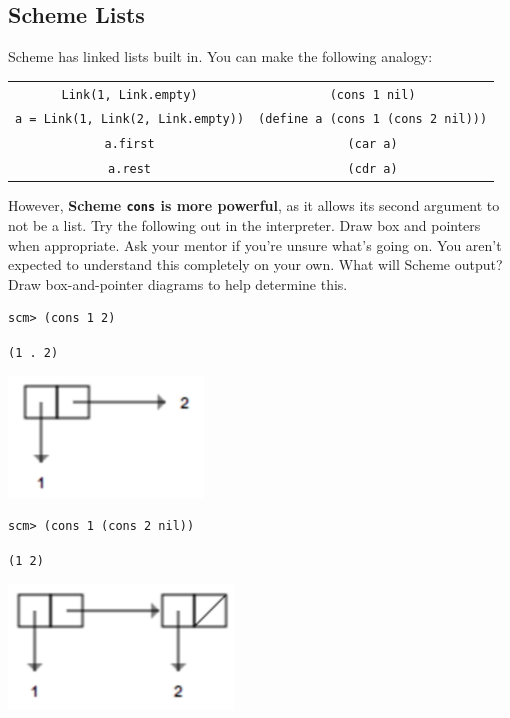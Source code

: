 \documentclass{exam}
\begin{document}
\begin{questions}
\section{Scheme Lists}
\begin{blocksection}
Scheme has linked lists built in. You can make the following analogy:
\begin{center}
\begin{tabular}{ |c|c| } 
\hline
 \texttt{Link(1, Link.empty)} & \texttt{(cons 1 nil)} \\ 
 \texttt{a = Link(1, Link(2, Link.empty))} & \texttt{(define a (cons 1 (cons 2 nil)))}  \\ 
 \texttt{a.first} & \texttt{(car a)} \\ 
 \texttt{a.rest} & \texttt{(cdr a)} \\
 \hline
\end{tabular}
\end{center}
However, \textbf{Scheme \texttt{cons} is more powerful}, as it allows its second argument to not be a list. Try the following out in the interpreter. Draw box and pointers when appropriate. Ask your mentor if you're unsure what's going on. You aren't expected to understand this completely on your own.
\question What will Scheme output? Draw box-and-pointer diagrams to help determine this.

\begin{lstlisting}
scm> (cons 1 2)
\end{lstlisting}
\begin{solution}[0.5in]
\texttt{(1 . 2)}
\begin{center}
\includegraphics[scale=1]{9a}
\end{center}
\end{solution}

\begin{lstlisting}
scm> (cons 1 (cons 2 nil))	
\end{lstlisting}
\begin{solution}[0.5in]
\texttt{(1 2)}
\begin{center}
\includegraphics[scale=1]{9b}
\end{center}
\end{solution}


\end{blocksection}
\end{questions}
\end{document}
